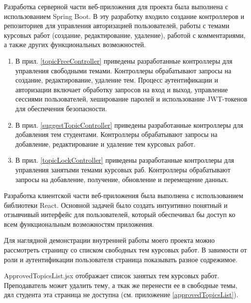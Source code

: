 \documentclass[14pt]{extarticle} %
\begin{document}
Разработка серверной части веб-приложения для проекта была выполнена с использованием Spring Boot. В эту разработку входило создание контроллеров и репозиториев для управления авторизацией пользователей, работы с темами курсовых работ (создание, редактирование, удаление),  работой с комментариями, а также других функциональных возможностей.

\begin{enumerate}[label=\arabic*)]

\item В прил. \ref{topicFreeController} приведены разработанные контроллеры для управления свободными темами. Контроллеры обрабатывают запросы на создание, редактирование, удаление тем. Процесс аутентификации и авторизации включает обработку запросов на вход и выход, управление сессиями пользователей, хеширование паролей и использование JWT-токенов для обеспечения безопасности.

\item В прил. \ref{suggestTopicController} приведены разработанные контроллеры для добавления тем студентами. Контроллеры обрабатывают запросы на добавление, редактирование и удаление тем курсовых работ. 

\item В прил. \ref{topicLockController} приведены разработанные контроллеры для управления занятыми темами курсовых раб. Контроллеры обрабатывают запросы на добавление, получение, обновление и перемещение данных.

\end{enumerate}



Разработка клиентской части веб-приложения была выполнена с использованием библиотеки React. Основной задачей было создать интуитивно понятный и отзывчивый интерфейс для пользователей, который обеспечивал бы доступ ко всем функциональным возможностям приложения.



Для наглядной демонстрации внутренней работы моего проекта можно рассмотреть страницу со списком свободных тем курсовых работ. В завимости от роли и аутентификации пользователя страница показывать разное содрежимое.



ApprovedTopicsList.jsx отображает список занятых тем курсовых работ. Преподаватель может удалить тему, а ткак же перенести ее в свободные темы, дял студента эта страница не доступна (см. приложение \ref{approvedTopicsList}).
\end{document}
